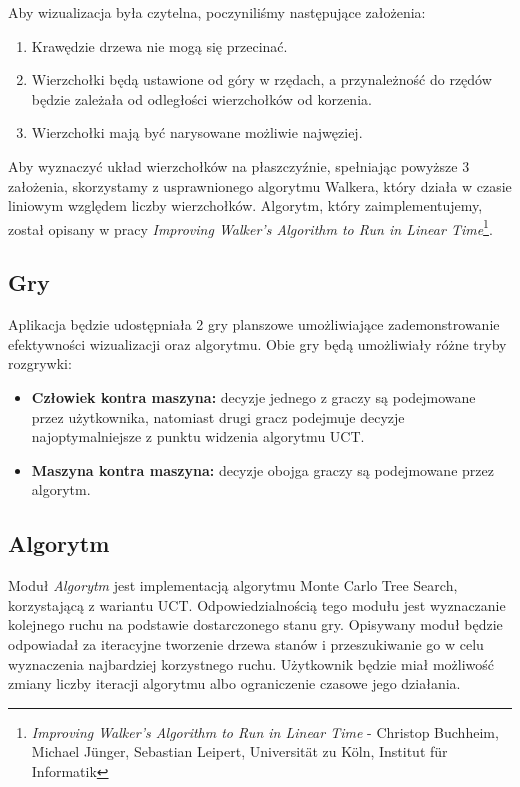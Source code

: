 \documentclass{article}
\newcommand{\modulename}[1]{\textit{#1}}
\begin{document}
	\noindent Aby wizualizacja była czytelna, poczyniliśmy następujące założenia: \\
	
	\begin{enumerate}
		\item Krawędzie drzewa nie mogą się przecinać.
		\item Wierzchołki będą ustawione od góry w rzędach, a przynależność do
		rzędów będzie zależała od odległości wierzchołków od korzenia.
		\item Wierzchołki mają być narysowane możliwie najwęziej.  \\
	\end{enumerate}

	\noindent Aby wyznaczyć układ wierzchołków na płaszczyźnie, spełniając powyższe 3 założenia, skorzystamy z usprawnionego algorytmu Walkera, który działa w czasie liniowym względem liczby wierzchołków. Algorytm, który zaimplementujemy, został opisany w pracy \textit{Improving Walker's Algorithm to Run in Linear Time}\footnote{\modulename{Improving Walker's Algorithm to Run in Linear Time} - Christop Buchheim, Michael Jünger, Sebastian Leipert, Universität zu Köln, Institut für Informatik}.
	
	\subsection{Gry}
	Aplikacja będzie udostępniała 2 gry planszowe umożliwiające zademonstrowanie efektywności wizualizacji oraz algorytmu. Obie gry będą umożliwiały różne tryby rozgrywki: \\
	
	\begin{itemize}
		\item \textbf{Człowiek kontra maszyna:} decyzje jednego z graczy są podejmowane przez użytkownika, natomiast drugi gracz podejmuje decyzje najoptymalniejsze z punktu widzenia algorytmu UCT.
		\item \textbf{Maszyna kontra maszyna:} decyzje obojga graczy są podejmowane przez algorytm. 
	\end{itemize}
	
	
	\subsection{Algorytm}
	Moduł \modulename{Algorytm} jest implementacją algorytmu Monte Carlo Tree Search, korzystającą z wariantu UCT. Odpowiedzialnością tego modułu jest wyznaczanie kolejnego ruchu na podstawie dostarczonego stanu gry. Opisywany moduł będzie odpowiadał za iteracyjne tworzenie drzewa stanów i przeszukiwanie go w celu wyznaczenia najbardziej korzystnego ruchu. Użytkownik będzie miał możliwość zmiany liczby iteracji algorytmu albo ograniczenie czasowe jego działania. \\
	
\end{document}
